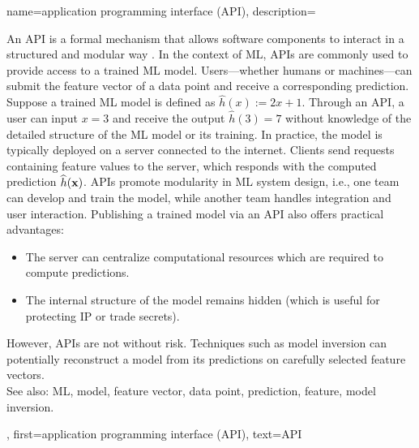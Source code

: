 {name={application programming interface (API)},
		description={			
			An  API is a formal mechanism that 
			allows software components to interact in a structured and modular way \cite{RestfulBook2013}.
			In the context of ML, APIs are commonly used to provide access to a trained ML model. 
			Users—whether humans or machines—can submit the feature vector of a data point and receive 
			a corresponding prediction. Suppose a trained ML model is defined 
			as $\widehat{h}(x) := 2 x + 1$. Through an API, a user 
			can input $x = 3$ and receive the output $\widehat{h}(3) = 7$ 
			without knowledge of the detailed structure of the ML model or its training. 
			In practice, the model is typically deployed on a server connected to the internet. 
			Clients send requests containing feature values to the server, which responds with 
			the computed prediction $\widehat{h}({\bf x})$. APIs promote modularity 
			in ML system design, i.e., one team can develop and train the model, while another team
			handles integration and user interaction. Publishing a trained model via an API also 
			offers practical advantages: 
			\begin{itemize} 
				\item The server can centralize computational resources which are required to compute predictions. 
		        \item The internal structure of the model remains hidden (which is useful for protecting IP or trade secrets). 
		    \end{itemize} 
			However, APIs are not without risk. Techniques such as model inversion can potentially reconstruct a 
			model from its predictions on carefully selected feature vectors.
					\\
		See also: ML, model, feature vector, data point, prediction, feature, model inversion.
			},
		first={application programming interface (API)},
		text={API}
}






